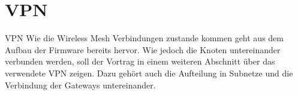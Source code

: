 \section{VPN}

\begin{frame}{VPN}
Wie die Wireless Mesh Verbindungen zustande kommen geht aus dem
Aufbau der Firmware bereits hervor. Wie jedoch die Knoten
untereinander verbunden werden, soll der Vortrag in einem weiteren
Abschnitt über das verwendete VPN zeigen. Dazu gehört auch die
Aufteilung in Subnetze und die Verbindung der Gateways
untereinander.
\end{frame}
